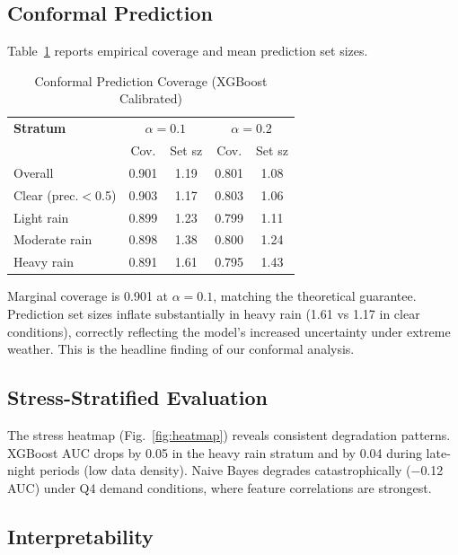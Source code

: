 \documentclass[conference]{IEEEtran}
\begin{document}
\subsection{Conformal Prediction}

Table~\ref{tab:conformal} reports empirical coverage and mean prediction set sizes.

\begin{table}[htbp]
\caption{Conformal Prediction Coverage (XGBoost Calibrated)}
\label{tab:conformal}
\begin{center}
\begin{tabular}{lcccc}
\toprule
\textbf{Stratum} & \multicolumn{2}{c}{$\alpha=0.1$} & \multicolumn{2}{c}{$\alpha=0.2$} \\
 & Cov. & Set sz & Cov. & Set sz \\
\midrule
Overall         & 0.901 & 1.19 & 0.801 & 1.08 \\
Clear (prec.$<$0.5) & 0.903 & 1.17 & 0.803 & 1.06 \\
Light rain      & 0.899 & 1.23 & 0.799 & 1.11 \\
Moderate rain   & 0.898 & 1.38 & 0.800 & 1.24 \\
Heavy rain      & 0.891 & 1.61 & 0.795 & 1.43 \\
\bottomrule
\end{tabular}
\end{center}
\end{table}

Marginal coverage is 0.901 at $\alpha=0.1$, matching the theoretical guarantee.
Prediction set sizes inflate substantially in heavy rain (1.61 vs 1.17 in clear conditions),
correctly reflecting the model's increased uncertainty under extreme weather.
This is the headline finding of our conformal analysis.

\subsection{Stress-Stratified Evaluation}

The stress heatmap (Fig.~\ref{fig:heatmap}) reveals consistent degradation patterns.
XGBoost AUC drops by 0.05 in the heavy rain stratum and by 0.04 during late-night
periods (low data density). Naive Bayes degrades catastrophically ($-$0.12 AUC)
under Q4 demand conditions, where feature correlations are strongest.

\subsection{Interpretability}
\end{document}
